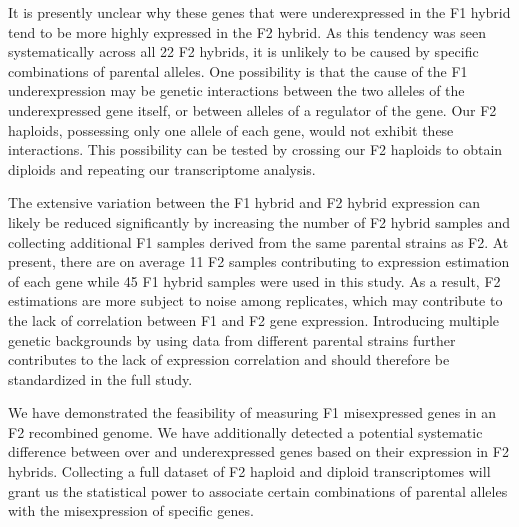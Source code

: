 It is presently unclear why these genes that were underexpressed in the F1 hybrid tend to be more highly expressed in the F2 hybrid. As this tendency was seen systematically across all 22 F2 hybrids, it is unlikely to be caused by specific combinations of parental alleles. One possibility is that the cause of the F1 underexpression may be genetic interactions between the two alleles of the underexpressed gene itself, or between alleles of a regulator of the gene. Our F2 haploids, possessing only one allele of each gene, would not exhibit these interactions. This possibility can be tested by crossing our F2 haploids to obtain diploids and repeating our transcriptome analysis.

The extensive variation between the F1 hybrid and F2 hybrid expression can likely be reduced significantly by increasing the number of F2 hybrid samples and collecting additional F1 samples derived from the same parental strains as F2. At present, there are on average 11 F2 samples contributing to expression estimation of each gene while 45 F1 hybrid samples were used in this study. As a result, F2 estimations are more subject to noise among replicates, which may contribute to the lack of correlation between F1 and F2 gene expression. Introducing multiple genetic backgrounds by using data from different parental strains further contributes to the lack of expression correlation and should therefore be standardized in the full study.

We have demonstrated the feasibility of measuring F1 misexpressed genes in an F2 recombined genome. We have additionally detected a potential systematic difference between over and underexpressed genes based on their expression in F2 hybrids. Collecting a full dataset of F2 haploid and diploid transcriptomes will grant us the statistical power to associate certain combinations of parental alleles with the misexpression of specific genes.